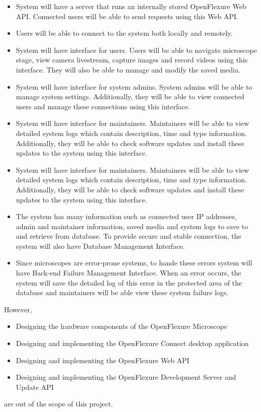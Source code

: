\begin{itemize}
  \item System will have a server that runs an internally stored OpenFlexure Web API. Connected users will be able to send requests using this Web API.
  \item Users will be able to connect to the system both locally and remotely.
  \item System will have interface for users. Users will be able to navigate microscope stage, view camera livestream, capture images and record videos using this interface. They will also be able to manage and modify the saved media.
  \item System will have interface for system admins. System admins will be able to manage system settings. Additionally, they will be able to view connected users and manage these connections using this interface.
  \item System will have interface for maintainers. Maintainers will be able to view detailed system logs which contain description, time and type information. Additionally, they will be able to check software updates and install these updates to the system using this interface.
  \item System will have interface for maintainers. Maintainers will be able to view detailed system logs which contain description, time and type information. Additionally, they will be able to check software updates and install these updates to the system using this interface.
  \item The system has many information such as connected user IP addresses, admin and maintainer information, saved media and system logs to save to and retrieve from database. To provide secure and stable connection, the system will also have Database Management Interface.
  \item Since microscopes are error-prone systems, to hande these errors system will have Back-end Failure Management Interface. When an error occurs, the system will save the detailed log of this error in the protected area of ​​the database and maintainers will be able view these system failure logs.
\end{itemize}
However,
\begin{itemize}
	\item Designing the hardware components of the OpenFlexure Microscope 
	\item Designing and implementing the OpenFlexure Connect desktop application
	\item Designing and implementing the OpenFlexure Web API
	\item Designing and implementing the OpenFlexure Development Server and Update API
\end{itemize}
are out of the scope of this project.
